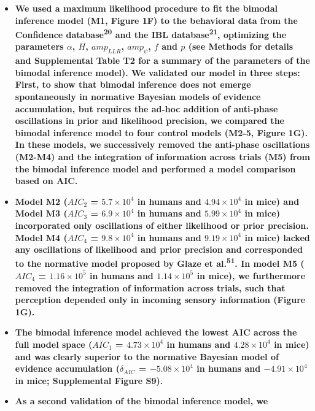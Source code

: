 \documentclass[
]{article}
\begin{document}
\begin{itemize}
\item
  \textbf{We used a maximum likelihood procedure to fit the bimodal
  inference model (M1, Figure 1F) to the behavioral data from the
  Confidence database\textsuperscript{20} and the IBL
  database\textsuperscript{21}, optimizing the parameters \(\alpha\),
  \(H\), \(amp_{LLR}\), \(amp_{\psi}\), \(f\) and \(p\) (see Methods for
  details and Supplemental Table T2 for a summary of the parameters of
  the bimodal inference model). We validated our model in three steps:
  First, to show that bimodal inference does not emerge spontaneously in
  normative Bayesian models of evidence accumulation, but requires the
  ad-hoc addition of anti-phase oscillations in prior and likelihood
  precision, we compared the bimodal inference model to four control
  models (M2-5, Figure 1G). In these models, we successively removed the
  anti-phase oscillations (M2-M4) and the integration of information
  across trials (M5) from the bimodal inference model and performed a
  model comparison based on AIC.}
\item
  \textbf{Model M2 (\(AIC_2\) = \(\ensuremath{5.7\times 10^{4}}\) in
  humans and \(\ensuremath{4.94\times 10^{4}}\) in mice) and Model M3
  (\(AIC_3\) = \(\ensuremath{6.9\times 10^{4}}\) in humans and
  \(\ensuremath{5.99\times 10^{4}}\) in mice) incorporated only
  oscillations of either likelihood or prior precision. Model M4
  (\(AIC_4\) = \(\ensuremath{9.8\times 10^{4}}\) in humans and
  \(\ensuremath{9.19\times 10^{4}}\) in mice) lacked any oscillations of
  likelihood and prior precision and corresponded to the normative model
  proposed by Glaze et al.\textsuperscript{51}. In model M5 (\(AIC_4\) =
  \(\ensuremath{1.16\times 10^{5}}\) in humans and
  \(\ensuremath{1.14\times 10^{5}}\) in mice), we furthermore removed
  the integration of information across trials, such that perception
  depended only in incoming sensory information (Figure 1G).}
\item
  \textbf{The bimodal inference model achieved the lowest AIC across the
  full model space (\(AIC_1\) = \(\ensuremath{4.73\times 10^{4}}\) in
  humans and \(\ensuremath{4.28\times 10^{4}}\) in mice) and was clearly
  superior to the normative Bayesian model of evidence accumulation
  (\(\delta_{AIC}\) = \(\ensuremath{-5.08\times 10^{4}}\) in humans and
  \(\ensuremath{-4.91\times 10^{4}}\) in mice; Supplemental Figure S9).}
\item
  \textbf{As a second validation of the bimodal inference model, we
}
\end{itemize}
\end{document}
